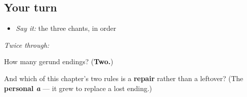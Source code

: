 \subsection*{Your turn}
\begin{itemize}
\raggedright
  \item \emph{Say it:} the three chants, in order
\end{itemize}

\emph{Twice through:}

\begin{tcolorbox}[breakable,colback=teal!4,colframe=teal!35!black,title={Before you move on}]
How many gerund endings? (\textbf{Two.})

And which of this chapter's two rules is a \textbf{repair} rather than a leftover? (The \textbf{personal \emph{a}} — it grew to replace a lost ending.)
\end{tcolorbox}
